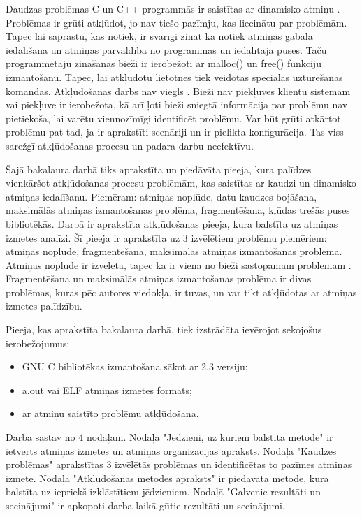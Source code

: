 ﻿Daudzas problēmas C un C++ programmās ir saistītas ar dinamisko atmiņu \cite{TFM}.
Problēmas ir grūti atkļūdot, jo nav tiešo pazīmju, kas liecinātu par problēmām.
Tāpēc lai saprastu, kas notiek, ir svarīgi zināt kā notiek atmiņas gabala iedalīšana un atmiņas pārvaldība no programmas un iedalītāja puses.
Taču programmētāju zināšanas bieži ir ierobežoti ar malloc() un free() funkciju izmantošanu. 
Tāpēc, lai atkļūdotu lietotnes tiek veidotas speciālās uzturēšanas komandas.
Atkļūdošanas darbs nav viegls \cite{ER}. Bieži nav piekļuves klientu sistēmām vai piekļuve ir ierobežota, kā arī ļoti bieži sniegtā informācija par problēmu nav pietiekoša, lai varētu viennozīmīgi identificēt problēmu.
Var būt grūti atkārtot problēmu pat tad, ja ir aprakstīti scenāriji un ir pielikta konfigurācija.
Tas viss sarežģī atkļūdošanas procesu un padara darbu neefektīvu.

Šajā bakalaura darbā tiks aprakstīta un piedāvāta pieeja, kura palīdzes vienkāršot atkļūdošanas procesu problēmām, kas saistītas ar kaudzi un dinamisko atmiņas iedalīšanu.
Piemēram: atmiņas noplūde, datu kaudzes bojāšana, maksimālās atmiņas izmantošanas problēma, fragmentēšana, kļūdas trešās puses bibliotēkās.
Darbā ir aprakstīta atkļūdošanas pieeja, kura balstīta uz atmiņas izmetes analīzi.
Šī pieeja ir aprakstīta uz 3 izvēlētiem problēmu piemēriem: atmiņas noplūde, fragmentēšana, maksimālās atmiņas izmantošanas problēma.
Atmiņas noplūde ir izvēlēta, tāpēc ka ir viena no bieži sastopamām problēmām \cite{GNED}.
Fragmentēšana un maksimālās atmiņas izmantošanas problēma ir divas problēmas, kuras pēc autores viedokļa, ir tuvas, un var tikt atkļūdotas ar atmiņas izmetes palīdzību.

Pieeja, kas aprakstīta bakalaura darbā, tiek izstrādāta ievērojot sekojošus ierobežojumus:
\begin{itemize}
	\item GNU C bibliotēkas izmantošana sākot ar 2.3 versiju;
    \item a.out vai ELF atmiņas izmetes formāts;
    \item ar atmiņu saistīto problēmu atkļūdošana.
\end{itemize} 

Darba sastāv no 4 nodaļām. Nodaļā "Jēdzieni, uz kuriem balstīta metode" ir ietverts atmiņas izmetes un atmiņas organizācijas apraksts.
Nodaļā "Kaudzes problēmas" aprakstītas 3 izvēlētās problēmas un identificētas to pazīmes atmiņas izmetē. 
Nodaļā "Atkļūdošanas metodes apraksts" ir piedāvāta metode, kura balstīta uz iepriekš izklāstītiem jēdzieniem.
Nodaļā "Galvenie rezultāti un secinājumi" ir apkopoti darba laikā gūtie rezultāti un secinājumi.

